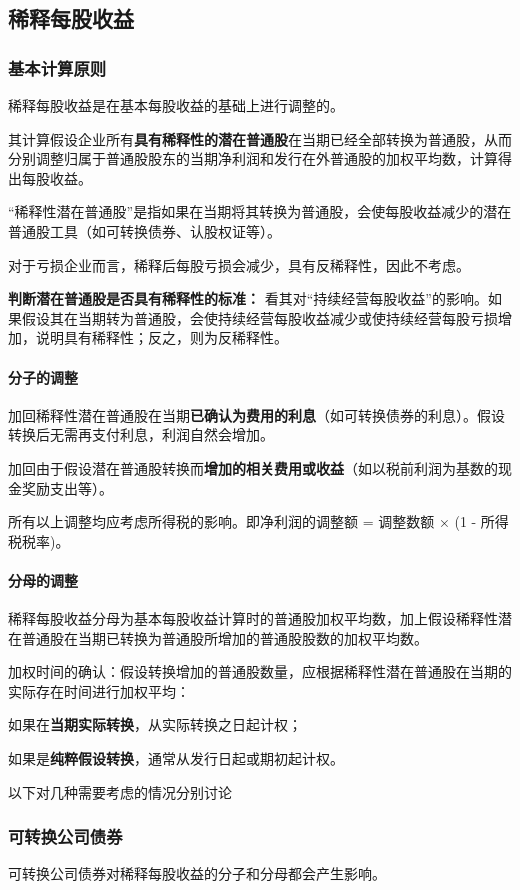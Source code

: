 \documentclass[UTF8,12pt]{ctexart}
\numberwithin{equation}{section} %
\numberwithin{figure}{section}
\numberwithin{table}{section}
\begin{document}
	
	\subsection{稀释每股收益}
	\subsubsection{基本计算原则}
	稀释每股收益是在基本每股收益的基础上进行调整的。
	
	其计算假设企业所有\textbf{具有稀释性的潜在普通股}在当期已经全部转换为普通股，从而分别调整归属于普通股股东的当期净利润和发行在外普通股的加权平均数，计算得出每股收益。
	
	“稀释性潜在普通股”是指如果在当期将其转换为普通股，会使每股收益减少的潜在普通股工具（如可转换债券、认股权证等）。
	
	对于亏损企业而言，稀释后每股亏损会减少，具有反稀释性，因此不考虑。
	
	
	\textbf{判断潜在普通股是否具有稀释性的标准：}
	看其对“持续经营每股收益”的影响。如果假设其在当期转为普通股，会使持续经营每股收益减少或使持续经营每股亏损增加，说明具有稀释性；反之，则为反稀释性。
	
	\paragraph{分子的调整}	
	加回稀释性潜在普通股在当期\textbf{已确认为费用的利息}（如可转换债券的利息）。假设转换后无需再支付利息，利润自然会增加。
	
	加回由于假设潜在普通股转换而\textbf{增加的相关费用或收益}（如以税前利润为基数的现金奖励支出等）。
	
	所有以上调整均应考虑所得税的影响。即净利润的调整额 = 调整数额 × (1 - 所得税税率)。
	
	\paragraph{分母的调整}
	稀释每股收益分母为基本每股收益计算时的普通股加权平均数，加上假设稀释性潜在普通股在当期已转换为普通股所增加的普通股股数的加权平均数。
	
	加权时间的确认：假设转换增加的普通股数量，应根据稀释性潜在普通股在当期的实际存在时间进行加权平均：
	
	如果在\textbf{当期实际转换}，从实际转换之日起计权；
	
	如果是\textbf{纯粹假设转换}，通常从发行日起或期初起计权。


	以下对几种需要考虑的情况分别讨论
	\subsubsection{可转换公司债券}
	可转换公司债券对稀释每股收益的分子和分母都会产生影响。
	
\end{document}
